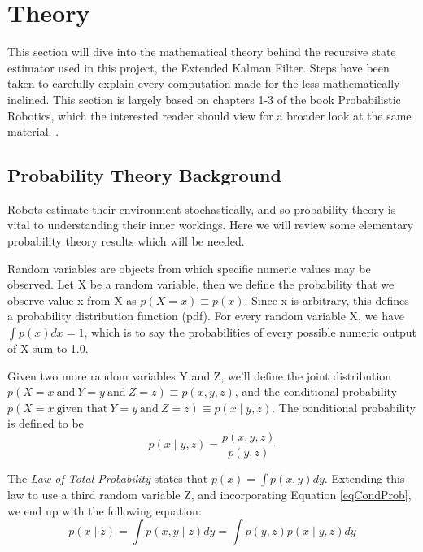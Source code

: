 \chapter{Theory}

This section will dive into the mathematical theory behind the recursive state estimator used in this project, the Extended Kalman Filter. Steps have been taken to carefully explain every computation made for the less mathematically inclined. This section is largely based on chapters 1-3 of the book Probabilistic Robotics, which the interested reader should view for a broader look at the same material. \cite{probabilisticRobotics}.

\section{Probability Theory Background}
Robots estimate their environment stochastically, and so probability theory is vital to understanding their inner workings. Here we will review some elementary probability theory results which will be needed.

Random variables are objects from which specific numeric values may be observed. Let X be a random variable, then we define the probability that we observe value x from X as \( p(X = x) \equiv p(x)\). Since x is arbitrary, this defines a probability distribution function (pdf). For every random variable X, we have \(\int p(x)dx = 1\), which is to say the probabilities of every possible numeric output of X sum to 1.0.

Given two more random variables Y and Z, we'll define the joint distribution \(p(X=x\ \textrm{and}\ Y=y\ \textrm{and}\ Z=z) \equiv p(x,y,z)\), and the conditional probability \(p(X=x\ \textrm{given that}\ Y=y\ \textrm{and}\ Z=z) \equiv p(x \mathbin{\vert} y,z)\). The conditional probability is defined to be
\begin{equation} \label{eqCondProb}
p(x \mathbin{\vert} y,z) = \frac{p(x,y,z)}{p(y,z)}
\end{equation}

The \textit{Law of Total Probability} states that \(p(x) = \int p(x,y)dy\). Extending this law to use a third random variable Z, and incorporating Equation \ref{eqCondProb}, we end up with the following equation:
\begin{equation} \label{eqTotalProb}
p(x \mathbin{\vert} z) = \int p(x,y \mathbin{\vert} z)dy
= \int p(y,z)p(x \mathbin{\vert} y,z)dy
\end{equation}

